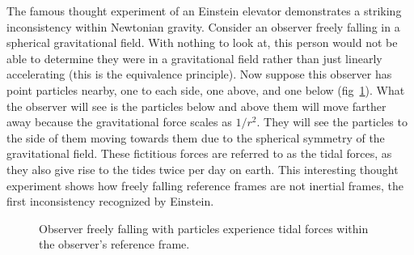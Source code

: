 The famous thought experiment of an Einstein elevator demonstrates a striking inconsistency within Newtonian gravity. Consider an observer freely falling in a spherical gravitational field. With nothing to look at, this person would not be able to determine they were in a gravitational field rather than just linearly accelerating (this is the equivalence principle). Now suppose this observer has point particles nearby, one to each side, one above, and one below (fig~\ref{fig:tidal_forces}). What the observer will see is the particles below and above them will move farther away because the gravitational force scales as $1/r^2$. They will see the particles to the side of them moving towards them due to the spherical symmetry of the gravitational field. These fictitious forces are referred to as the tidal forces, as they also give rise to the tides twice per day on earth. This interesting thought experiment shows how freely falling reference frames are not inertial frames, the first inconsistency recognized by Einstein. 
\begin{figure}
    \centering
    \caption{Observer freely falling with particles experience tidal forces within the observer's reference frame.}
    \label{fig:tidal_forces}
\end{figure}

